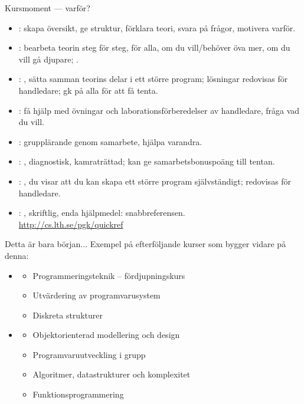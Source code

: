 \begin{Slide}{Kursmoment --- varför?}\SlideOnly{\footnotesize}
\begin{itemize}

\item {}: skapa översikt, ge struktur, förklara teori, svara på frågor, motivera varför.

\item {}: bearbeta teorin steg för steg,  för alla,  om du vill/behöver öva mer,  om du vill gå djupare; .

\item {}: , sätta samman teorins delar i ett större program; lösningar redovisas för handledare; gk på alla för att få tenta.

\item {}: få hjälp med övningar och laborationsförberedelser av handledare, fråga vad du vill.

\item {}: grupplärande genom samarbete, hjälpa varandra.

\item {}: , diagnostisk, kamraträttad; kan ge samarbetsbonuspoäng till tentan.

\item {}: , du visar att du kan skapa ett större program självständigt; redovisas för handledare.

\item {}: , skriftlig, enda hjälpmedel: snabbreferensen.\\   \url{http://cs.lth.se/pgk/quickref}
\end{itemize}
\end{Slide}

\ifkompendium\else
\begin{Slide}{Detta är bara början... }
Exempel på efterföljande kurser som bygger vidare på denna:
\begin{itemize}
\item {}
\begin{itemize}
\item Programmeringsteknik -- fördjupningskurs
\item Utvärdering av programvarusystem
\item Diskreta strukturer
\end{itemize}
\item {}
\begin{itemize}
\item Objektorienterad modellering och design
\item Programvaruutveckling i grupp
\item Algoritmer, datastrukturer och komplexitet
\item Funktionsprogrammering
\end{itemize}
\end{itemize}
\end{Slide}


